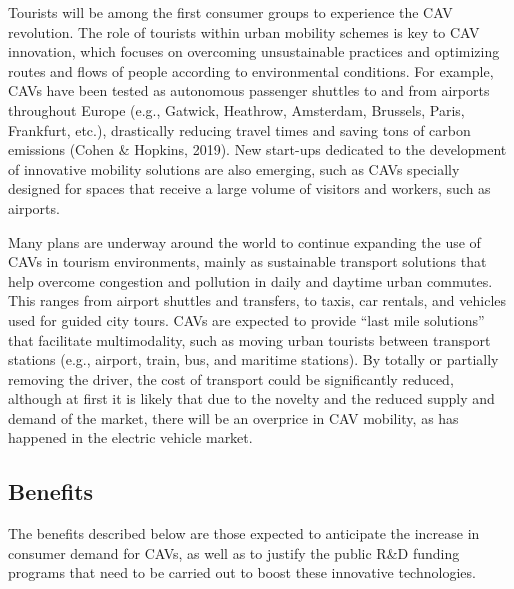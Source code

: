 \documentclass[
  letterpaper,
  DIV=11,
  numbers=noendperiod]{scrreprt}
\begin{document}
Tourists will be among the first consumer groups to experience the CAV
revolution. The role of tourists within urban mobility schemes is key to
CAV innovation, which focuses on overcoming unsustainable practices and
optimizing routes and flows of people according to environmental
conditions. For example, CAVs have been tested as autonomous passenger
shuttles to and from airports throughout Europe (e.g., Gatwick,
Heathrow, Amsterdam, Brussels, Paris, Frankfurt, etc.), drastically
reducing travel times and saving tons of carbon emissions (Cohen \&
Hopkins, 2019). New start-ups dedicated to the development of innovative
mobility solutions are also emerging, such as CAVs specially designed
for spaces that receive a large volume of visitors and workers, such as
airports.

Many plans are underway around the world to continue expanding the use
of CAVs in tourism environments, mainly as sustainable transport
solutions that help overcome congestion and pollution in daily and
daytime urban commutes. This ranges from airport shuttles and transfers,
to taxis, car rentals, and vehicles used for guided city tours. CAVs are
expected to provide ``last mile solutions'' that facilitate
multimodality, such as moving urban tourists between transport stations
(e.g., airport, train, bus, and maritime stations). By totally or
partially removing the driver, the cost of transport could be
significantly reduced, although at first it is likely that due to the
novelty and the reduced supply and demand of the market, there will be
an overprice in CAV mobility, as has happened in the electric vehicle
market.

\hypertarget{benefits-4}{%
\subsection{Benefits}\label{benefits-4}}

The benefits described below are those expected to anticipate the
increase in consumer demand for CAVs, as well as to justify the public
R\&D funding programs that need to be carried out to boost these
innovative technologies.
\end{document}
